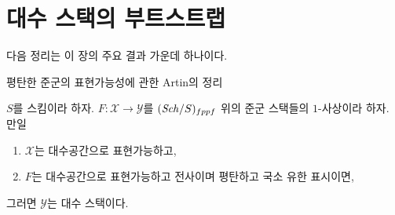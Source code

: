 \section{대수 스택의 부트스트랩}
\label{section-bootstrap}

\noindent
다음 정리는 이 장의 주요 결과 가운데 하나이다.

\begin{theorem}
\label{theorem-bootstrap}
\begin{slogan}
평탄한 준군의 표현가능성에 관한 Artin의 정리
\end{slogan}
$S$를 스킴이라 하자. $F : \mathcal{X} \to \mathcal{Y}$를
$(\mathit{Sch}/S)_{fppf}$ 위의 준군 스택들의 $1$-사상이라 하자. 만일
\begin{enumerate}
\item $\mathcal{X}$는 대수공간으로 표현가능하고,
\item $F$는 대수공간으로 표현가능하고 전사이며 평탄하고
국소 유한 표시이면,
\end{enumerate}
그러면 $\mathcal{Y}$는 대수 스택이다.
\end{theorem}

